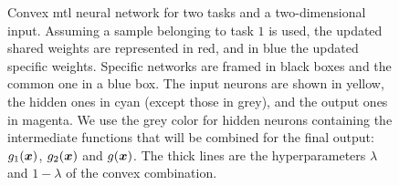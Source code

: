 \begin{figure}[t!]
    \caption[Convex \acrshort{mtl} neural network for two tasks and a two-dimensional input.]{Convex \acrshort{mtl} neural network for two tasks and a two-dimensional input.
    Assuming a sample belonging to task $1$ is used, the updated shared weights are represented in red, and in blue the updated specific weights. 
    Specific networks are framed in black boxes and the common one in a blue box.
    The input neurons are shown in yellow, the hidden ones in cyan (except those in grey), and the output ones in magenta. 
    We use the grey color for hidden neurons containing the intermediate functions that will be combined for the final output: $g_1(\bm{x})$, $g_2(\bm{x})$ and $g(\bm{x})$.
    The thick lines are the hyperparameters $\lambda$ and $1-\lambda$ of the convex combination. 
	}
    \label{fig:convexmtl_nn}
\end{figure}
